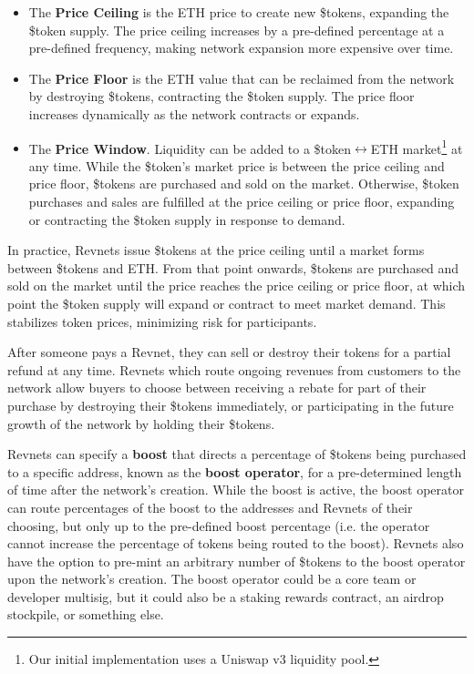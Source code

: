 \documentclass{article}
\begin{document}
\begin{itemize}
  \item The \textbf{Price Ceiling} is the ETH price to create new \$tokens, expanding the \$token supply. The price ceiling increases by a pre-defined percentage at a pre-defined frequency, making network expansion more expensive over time.
  \item The \textbf{Price Floor} is the ETH value that can be reclaimed from the network by destroying \$tokens, contracting the \$token supply. The price floor increases dynamically as the network contracts or expands.
  \item The \textbf{Price Window}. Liquidity can be added to a \$token$\leftrightarrow$ETH market\footnote{Our initial implementation uses a Uniswap v3 liquidity pool.} at any time. While the \$token's market price is between the price ceiling and price floor, \$tokens are purchased and sold on the market. Otherwise, \$token purchases and sales are fulfilled at the price ceiling or price floor, expanding or contracting the \$token supply in response to demand.
\end{itemize}

In practice, Revnets issue \$tokens at the price ceiling until a market forms between \$tokens and ETH. From that point onwards, \$tokens are purchased and sold on the market until the price reaches the price ceiling or price floor, at which point the \$token supply will expand or contract to meet market demand. This stabilizes token prices, minimizing risk for participants.

After someone pays a Revnet, they can sell or destroy their tokens for a partial refund at any time. Revnets which route ongoing revenues from customers to the network allow buyers to choose between receiving a rebate for part of their purchase by destroying their \$tokens immediately, or participating in the future growth of the network by holding their \$tokens.

Revnets can specify a \textbf{boost} that directs a percentage of \$tokens being purchased to a specific address, known as the \textbf{boost operator}, for a pre-determined length of time after the network's creation. While the boost is active, the boost operator can route percentages of the boost to the addresses and Revnets of their choosing, but only up to the pre-defined boost percentage (i.e. the operator cannot increase the percentage of tokens being routed to the boost). Revnets also have the option to pre-mint an arbitrary number of \$tokens to the boost operator upon the network's creation. The boost operator could be a core team or developer multisig, but it could also be a staking rewards contract, an airdrop stockpile, or something else. 
\end{document}
